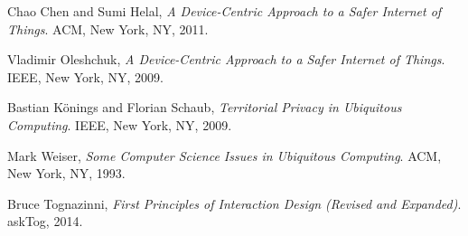 \documentclass[11pt, oneside]{article}   	%
\begin{document}



\begin{thebibliography}{9}

  Chao Chen and Sumi Helal,
  \emph{A Device-Centric Approach to a Safer Internet of Things}.
  ACM, New York, NY,
  2011.
  
  Vladimir Oleshchuk,
  \emph{A Device-Centric Approach to a Safer Internet of Things}.
  IEEE, New York, NY,
  2009.
  
  Bastian K{\"o}nings and Florian Schaub,
  \emph{Territorial Privacy in Ubiquitous Computing}.
  IEEE, New York, NY,
  2009.
  
  Mark Weiser,
  \emph{Some Computer Science Issues in Ubiquitous Computing}.
  ACM, New York, NY,
  1993.
  
  Bruce Tognazinni,
  \emph{First Principles of Interaction Design (Revised and Expanded)}.
  askTog,
  2014.



\end{thebibliography}
\end{document}
